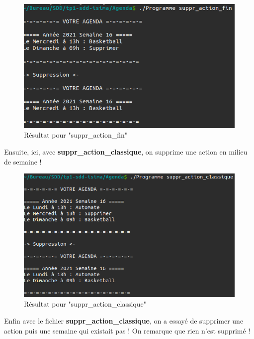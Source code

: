 \documentclass[12pt,french]{article} %
\begin{document}
\begin{figure}[H]
	\includegraphics[scale=0.6]{su-af.png}
	\centering
	\caption{Résultat pour "suppr\_action\_fin"}
\end{figure}

Ensuite, ici, avec \textbf{suppr\_action\_classique}, on supprime une action en milieu de semaine !\newline

\begin{figure}[H]
	\includegraphics[scale=0.6]{su-ac.png}
	\centering
	\caption{Résultat pour "suppr\_action\_classique"}
\end{figure}

Enfin avec le fichier \textbf{suppr\_action\_classique}, on a essayé de supprimer une action puis une semaine qui existait pas ! On remarque que rien n'est supprimé !\newline
\end{document}
